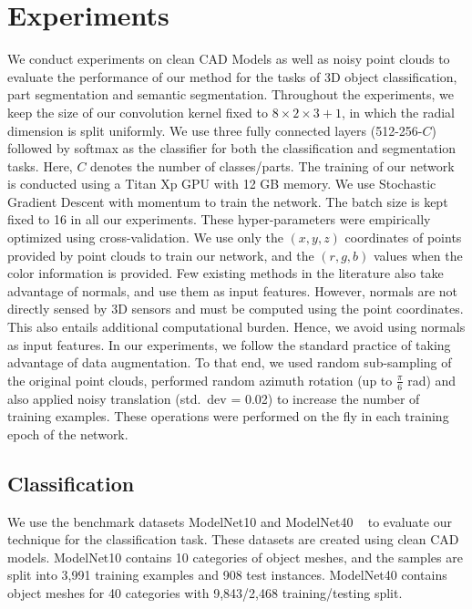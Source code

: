 \documentclass[10pt,twocolumn,letterpaper]{article}
\begin{document}
{\section{Experiments}
\vspace{-2mm}
We conduct experiments on clean CAD Models as well as noisy  point clouds to evaluate the performance of our method for the tasks of 3D object classification, part segmentation and semantic segmentation. Throughout the experiments, we keep the size of our convolution kernel fixed to  $8\times2\times3+1$, in which the radial dimension is split uniformly. We use three fully connected layers (512-256-$C$) followed by softmax as the classifier for both the classification and segmentation tasks. Here, $C$ denotes the number of classes/parts.
The training of our network is conducted using a Titan Xp GPU with 12 GB memory.
We use Stochastic Gradient Descent with momentum to train the network. The batch size  is kept fixed to 16 in all our experiments.
These hyper-parameters were empirically optimized using cross-validation.
We use only the  $(x,y,z)$ coordinates of points provided by point clouds to train our network, and the $(r,g,b)$ values when the color information is provided.
Few existing methods in the literature also take advantage of normals, and use them as input features. 
However, normals are not directly sensed by 3D sensors and must be computed using the point coordinates. This also entails additional computational burden. Hence, we avoid using normals as input features.
In our experiments, we follow the standard practice of taking advantage of data augmentation. 
To that end, we used random sub-sampling of the original  point clouds, performed random azimuth rotation (up to $\frac{\pi}{6}$ rad) and also applied noisy translation (std.~dev = 0.02) to increase the number of training examples. These operations were performed on the fly in each training epoch of the network.  \subsection{Classification}
\vspace{-2mm}
We use the  benchmark datasets ModelNet10 and ModelNet40 ~\cite{wu20153d} to evaluate our technique for the classification task.
These  datasets are created using clean CAD models.  ModelNet10 contains 10 categories of object meshes, and the samples are split into 3,991 training examples and 908 test instances. ModelNet40 contains object meshes for 40 categories with 9,843/2,468 training/testing split.

}
\end{document}
